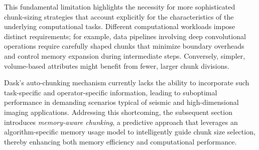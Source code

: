 This fundamental limitation highlights the necessity for more sophisticated chunk-sizing strategies that account explicitly for the characteristics of the underlying computational tasks.
Different computational workloads impose distinct requirements; for example, data pipelines involving deep convolutional operations require carefully shaped chunks that minimize boundary overheads and control memory expansion during intermediate steps.
Conversely, simpler, volume-based attributes might benefit from fewer, larger chunk divisions.

Dask’s auto-chunking mechanism currently lacks the ability to incorporate such task-specific and operator-specific information, leading to suboptimal performance in demanding scenarios typical of seismic and high-dimensional imaging applications.
Addressing this shortcoming, the subsequent section introduces \emph{memory-aware chunking}, a predictive approach that leverages an algorithm-specific memory usage model to intelligently guide chunk size selection, thereby enhancing both memory efficiency and computational performance.